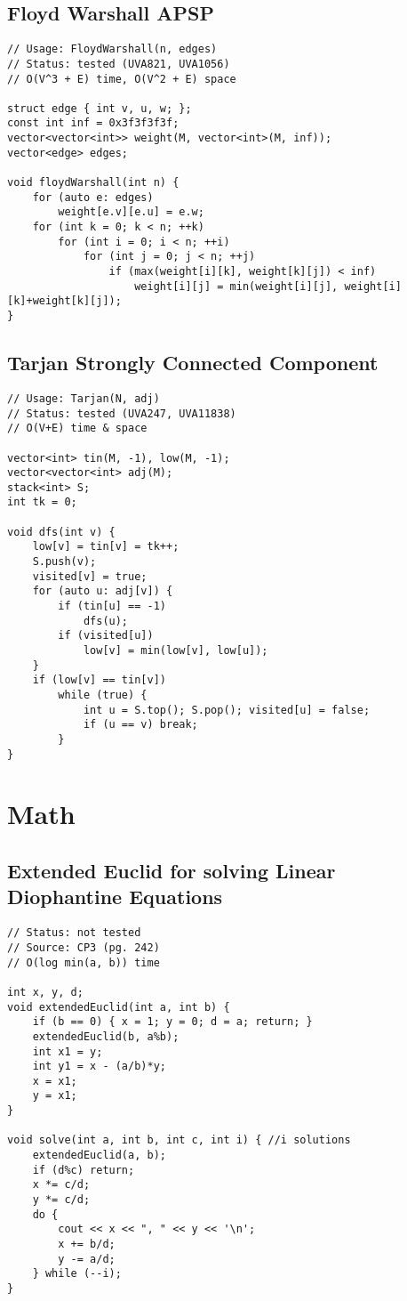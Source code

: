 \documentclass[12pt, a4paper, twoside]{article}
\begin{document}
\subsection{Floyd Warshall APSP}
\begin{lstlisting}
// Usage: FloydWarshall(n, edges)
// Status: tested (UVA821, UVA1056)
// O(V^3 + E) time, O(V^2 + E) space

struct edge { int v, u, w; };
const int inf = 0x3f3f3f3f;
vector<vector<int>> weight(M, vector<int>(M, inf));
vector<edge> edges;

void floydWarshall(int n) {
	for (auto e: edges)
		weight[e.v][e.u] = e.w;
	for (int k = 0; k < n; ++k)
		for (int i = 0; i < n; ++i)
			for (int j = 0; j < n; ++j)
				if (max(weight[i][k], weight[k][j]) < inf)
					weight[i][j] = min(weight[i][j], weight[i][k]+weight[k][j]);
}
\end{lstlisting}

\subsection{Tarjan Strongly Connected Component}
\begin{lstlisting}
// Usage: Tarjan(N, adj)
// Status: tested (UVA247, UVA11838)
// O(V+E) time & space

vector<int> tin(M, -1), low(M, -1);
vector<vector<int> adj(M);
stack<int> S;
int tk = 0;

void dfs(int v) {
	low[v] = tin[v] = tk++;
	S.push(v);
	visited[v] = true;
	for (auto u: adj[v]) {
		if (tin[u] == -1)
			dfs(u);
		if (visited[u])
			low[v] = min(low[v], low[u]);
	}
	if (low[v] == tin[v])
		while (true) {
			int u = S.top(); S.pop(); visited[u] = false;
			if (u == v) break;
		}
}
\end{lstlisting}



\section{Math}

\subsection{Extended Euclid for solving Linear Diophantine Equations}
\begin{lstlisting}
// Status: not tested
// Source: CP3 (pg. 242)
// O(log min(a, b)) time

int x, y, d;
void extendedEuclid(int a, int b) {
	if (b == 0) { x = 1; y = 0; d = a; return; }
	extendedEuclid(b, a%b);
	int x1 = y;
	int y1 = x - (a/b)*y;
	x = x1;
	y = x1;
}

void solve(int a, int b, int c, int i) { //i solutions
	extendedEuclid(a, b);
	if (d%c) return;
	x *= c/d;
	y *= c/d;
	do {
		cout << x << ", " << y << '\n';
		x += b/d;
		y -= a/d;
	} while (--i);
}
\end{lstlisting}
\end{document}
